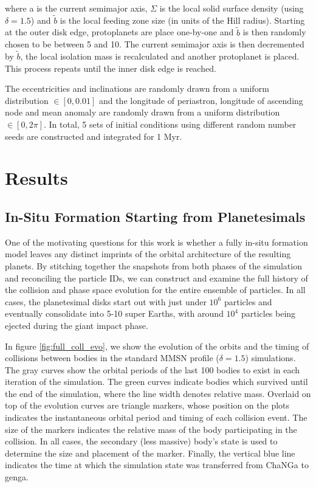 \noindent where a is the current semimajor axis, $\Sigma$ is the local solid surface density (using $\delta = 1.5$) and $\tilde{b}$ is the local feeding zone size (in units of the Hill radius). Starting at the outer disk edge, protoplanets are place one-by-one and $\tilde{b}$ is then randomly chosen to be between 5 and 10. The current semimajor axis is then decremented by $\tilde{b}$, the local isolation mass is recalculated and another protoplanet is placed. This process repeats until the inner disk edge is reached.

The eccentricities and inclinations are randomly drawn from a uniform distribution $\in \left[ 0, 0.01 \right]$ and the longitude of periastron, longitude of ascending node and mean anomaly are randomly drawn from a uniform distribution $\in \left[ 0, 2 \pi \right]$. In total, 5 sets of initial conditions using different random number seeds are constructed and integrated for 1 Myr.

\section{Results} \label{sec:results}

\subsection{In-Situ Formation Starting from Planetesimals}

One of the motivating questions for this work is whether a fully in-situ formation model leaves any distinct imprints of the orbital architecture of the resulting planets. By stitching together the snapshots from both phases of the simulation and reconciling the particle IDs, we can construct and examine the full history of the collision and phase space evolution for the entire ensemble of particles. In all cases, the planetesimal disks start out with just under $10^{6}$ particles and eventually consolidate into 5-10 super Earths, with around $10^{4}$ particles being ejected during the giant impact phase.

In figure \ref{fig:full_coll_evo}, we show the evolution of the orbits and the timing of collisions between bodies in the standard MMSN profile ($\delta = 1.5$) simulations. The gray curves show the orbital periods of the last 100 bodies to exist in each iteration of the simulation. The green curves indicate bodies which survived until the end of the simulation, where the line width denotes relative mass. Overlaid on top of the evolution curves are triangle markers, whose position on the plots indicates the instantaneous orbital period and timing of each collision event. The size of the markers indicates the relative mass of the body participating in the collision. In all cases, the secondary (less massive) body's state is used to determine the size and placement of the marker. Finally, the vertical blue line indicates the time at which the simulation state was transferred from {\sc ChaNGa} to {\sc genga}.

